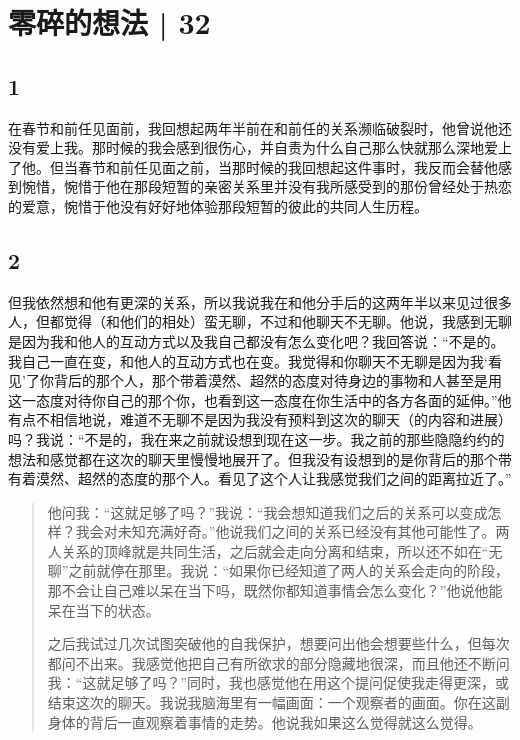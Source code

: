 \chapter{零碎的想法 | 32}




\section*{1}

在春节和前任见面前，我回想起两年半前在和前任的关系濒临破裂时，他曾说他还没有爱上我。那时候的我会感到很伤心，并自责为什么自己那么快就那么深地爱上了他。但当春节和前任见面之前，当那时候的我回想起这件事时，我反而会替他感到惋惜，惋惜于他在那段短暂的亲密关系里并没有我所感受到的那份曾经处于热恋的爱意，惋惜于他没有好好地体验那段短暂的彼此的共同人生历程。


\section*{2}

但我依然想和他有更深的关系，所以我说我在和他分手后的这两年半以来见过很多人，但都觉得（和他们的相处）蛮无聊，不过和他聊天不无聊。他说，我感到无聊是因为我和他人的互动方式以及我自己都没有怎么变化吧？我回答说：“不是的。我自己一直在变，和他人的互动方式也在变。我觉得和你聊天不无聊是因为我‘看见’了你背后的那个人，那个带着漠然、超然的态度对待身边的事物和人甚至是用这一态度对待你自己的那个你，也看到这一态度在你生活中的各方各面的延伸。”他有点不相信地说，难道不无聊不是因为我没有预料到这次的聊天（的内容和进展）吗？我说：“不是的，我在来之前就设想到现在这一步。我之前的那些隐隐约约的想法和感觉都在这次的聊天里慢慢地展开了。但我没有设想到的是你背后的那个带有着漠然、超然的态度的那个人。看见了这个人让我感觉我们之间的距离拉近了。”

\blockquote{
	他问我：“这就足够了吗？”我说：“我会想知道我们之后的关系可以变成怎样？我会对未知充满好奇。”他说我们之间的关系已经没有其他可能性了。两人关系的顶峰就是共同生活，之后就会走向分离和结束，所以还不如在“无聊”之前就停在那里。我说：“如果你已经知道了两人的关系会走向的阶段，那不会让自己难以呆在当下吗，既然你都知道事情会怎么变化？”他说他能呆在当下的状态。

	之后我试过几次试图突破他的自我保护，想要问出他会想要些什么，但每次都问不出来。我感觉他把自己有所欲求的部分隐藏地很深，而且他还不断问我：“这就足够了吗？”同时，我也感觉他在用这个提问促使我走得更深，或结束这次的聊天。我说我脑海里有一幅画面：一个观察者的画面。你在这副身体的背后一直观察着事情的走势。他说我如果这么觉得就这么觉得。

}

